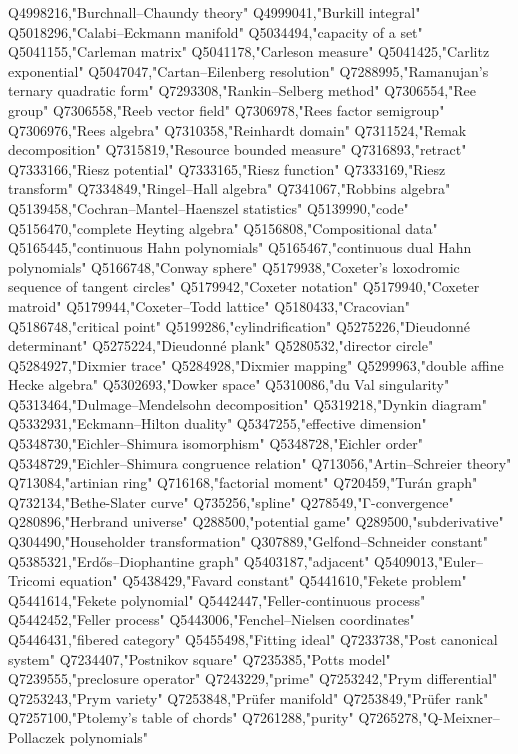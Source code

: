 Q4998216,"Burchnall–Chaundy theory"
Q4999041,"Burkill integral"
Q5018296,"Calabi–Eckmann manifold"
Q5034494,"capacity of a set"
Q5041155,"Carleman matrix"
Q5041178,"Carleson measure"
Q5041425,"Carlitz exponential"
Q5047047,"Cartan–Eilenberg resolution"
Q7288995,"Ramanujan's ternary quadratic form"
Q7293308,"Rankin–Selberg method"
Q7306554,"Ree group"
Q7306558,"Reeb vector field"
Q7306978,"Rees factor semigroup"
Q7306976,"Rees algebra"
Q7310358,"Reinhardt domain"
Q7311524,"Remak decomposition"
Q7315819,"Resource bounded measure"
Q7316893,"retract"
Q7333166,"Riesz potential"
Q7333165,"Riesz function"
Q7333169,"Riesz transform"
Q7334849,"Ringel–Hall algebra"
Q7341067,"Robbins algebra"
Q5139458,"Cochran–Mantel–Haenszel statistics"
Q5139990,"code"
Q5156470,"complete Heyting algebra"
Q5156808,"Compositional data"
Q5165445,"continuous Hahn polynomials"
Q5165467,"continuous dual Hahn polynomials"
Q5166748,"Conway sphere"
Q5179938,"Coxeter's loxodromic sequence of tangent circles"
Q5179942,"Coxeter notation"
Q5179940,"Coxeter matroid"
Q5179944,"Coxeter–Todd lattice"
Q5180433,"Cracovian"
Q5186748,"critical point"
Q5199286,"cylindrification"
Q5275226,"Dieudonné determinant"
Q5275224,"Dieudonné plank"
Q5280532,"director circle"
Q5284927,"Dixmier trace"
Q5284928,"Dixmier mapping"
Q5299963,"double affine Hecke algebra"
Q5302693,"Dowker space"
Q5310086,"du Val singularity"
Q5313464,"Dulmage–Mendelsohn decomposition"
Q5319218,"Dynkin diagram"
Q5332931,"Eckmann–Hilton duality"
Q5347255,"effective dimension"
Q5348730,"Eichler–Shimura isomorphism"
Q5348728,"Eichler order"
Q5348729,"Eichler–Shimura congruence relation"
Q713056,"Artin–Schreier theory"
Q713084,"artinian ring"
Q716168,"factorial moment"
Q720459,"Turán graph"
Q732134,"Bethe-Slater curve"
Q735256,"spline"
Q278549,"Γ-convergence"
Q280896,"Herbrand universe"
Q288500,"potential game"
Q289500,"subderivative"
Q304490,"Householder transformation"
Q307889,"Gelfond–Schneider constant"
Q5385321,"Erdős–Diophantine graph"
Q5403187,"adjacent"
Q5409013,"Euler–Tricomi equation"
Q5438429,"Favard constant"
Q5441610,"Fekete problem"
Q5441614,"Fekete polynomial"
Q5442447,"Feller-continuous process"
Q5442452,"Feller process"
Q5443006,"Fenchel–Nielsen coordinates"
Q5446431,"fibered category"
Q5455498,"Fitting ideal"
Q7233738,"Post canonical system"
Q7234407,"Postnikov square"
Q7235385,"Potts model"
Q7239555,"preclosure operator"
Q7243229,"prime"
Q7253242,"Prym differential"
Q7253243,"Prym variety"
Q7253848,"Prüfer manifold"
Q7253849,"Prüfer rank"
Q7257100,"Ptolemy's table of chords"
Q7261288,"purity"
Q7265278,"Q-Meixner–Pollaczek polynomials"
